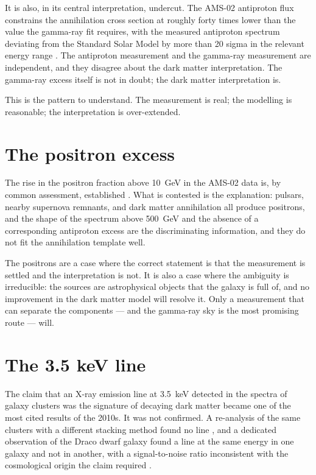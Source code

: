 It is also, in its central interpretation, undercut. The AMS-02 antiproton
flux constrains the annihilation cross section at roughly forty times lower
than the value the gamma-ray fit requires, with the measured antiproton
spectrum deviating from the Standard Solar Model by more than 20 sigma in
the relevant energy range . The antiproton
measurement and the gamma-ray measurement are independent, and they disagree
about the dark matter interpretation. The gamma-ray excess itself is not in
doubt; the dark matter interpretation is.

This is the pattern to understand. The measurement is real; the modelling is
reasonable; the interpretation is over-extended.

\section{The positron excess}The rise in the positron fraction above 10~GeV in the
AMS-02 data is, by common assessment, established . What
is contested is the explanation: pulsars, nearby supernova remnants, and
dark matter annihilation all produce positrons, and the shape of the spectrum
above 500~GeV and the absence of a corresponding antiproton excess are the
discriminating information, and they do not fit the annihilation template
well.

The positrons are a case where the correct statement is that the measurement
is settled and the interpretation is not. It is also a case where the
ambiguity is irreducible: the sources are astrophysical objects that the
galaxy is full of, and no improvement in the dark matter model will resolve
it. Only a measurement that can separate the components --- and the
gamma-ray sky is the most promising route --- will.

\section{The 3.5 keV line}The claim that an X-ray emission line at 3.5~keV
detected in the spectra of galaxy clusters was the signature of decaying
dark matter became one of the most cited results of the 2010s. It was not
confirmed. A re-analysis of the same clusters with a different stacking
method found no line , and a dedicated
observation of the Draco dwarf galaxy found a line at the same energy in one
galaxy and not in another, with a signal-to-noise ratio inconsistent with
the cosmological origin the claim required .

